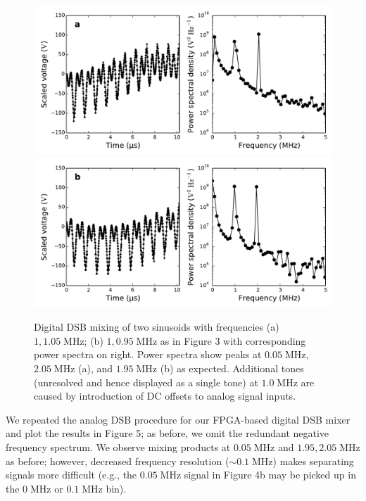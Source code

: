 \documentclass[11pt]{article}
\newcommand {\mt}{\mathrm}
\newcommand {\unit}[1]{\; \mt{#1}}
\begin{document}
\begin{figure}[!t]
    \centering
    \includegraphics[scale=0.45]{scripts/digital_mixing_DSB_0.pdf} \\
    \includegraphics[scale=0.45]{scripts/digital_mixing_DSB_1.pdf} \\
    \caption{Digital DSB mixing of two sinusoids with frequencies (a) $1, 1.05
    \unit{MHz}$; (b) $1, 0.95 \unit{MHz}$ as in Figure 3 with corresponding
    power spectra on right.
    Power spectra show peaks at $0.05 \unit{MHz}$, $2.05 \unit{MHz}$ (a), and
    $1.95 \unit{MHz}$ (b) as expected.  Additional tones (unresolved and hence
    displayed as a single tone) at $1.0 \unit{MHz}$ are caused by introduction
    of DC offsets to analog signal inputs.}
\end{figure}

We repeated the analog DSB procedure for our FPGA-based digital DSB mixer and
plot the results in Figure 5; as before, we omit the redundant negative
frequency spectrum.  We observe mixing products at $0.05 \unit{MHz}$ and $1.95,
2.05 \unit{MHz}$ as before; however, decreased frequency resolution ($\sim 0.1
\unit{MHz}$) makes separating signals more difficult (e.g., the $0.05
\unit{MHz}$ signal in Figure 4b may be picked up in the $0 \unit{MHz}$ or $0.1
\unit{MHz}$ bin).
\end{document}
